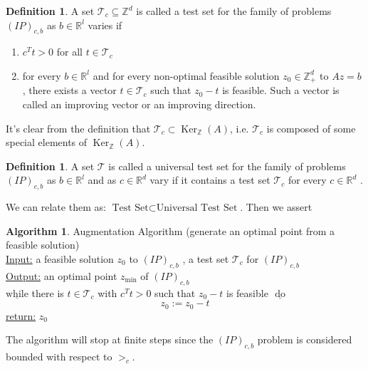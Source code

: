 \documentclass{article}
\theoremstyle{plain}
\theoremstyle{definition}
\newtheorem{definition}[theorem]{Definition}
\newtheorem{algorithm}[theorem]{Algorithm}
\begin{document}
\begin{definition}
A  set  $\mathcal{T}_{c} \subseteq \mathbb{Z}^{d}$  is called a test set for the family of problems  $(I P)_{c, b}$  as  $b \in \mathbb{R}^{l}$  varies if 
\begin{enumerate}
    \item $c^{T} t>0$  for all  $t \in \mathcal{T}_{c}$
    \item for every  $b \in \mathbb{R}^{l}$  and for every non-optimal feasible solution  $z_{0} \in \mathbb{Z}_{+}^{d}$  to  $A z=b$ , there exists a vector  $t \in \mathcal{T}_{c}$  such that  $z_{0}-t$  is feasible. Such a vector is called an improving vector or an improving direction.
\end{enumerate}
\end{definition}

It's clear from the definition that $\mathcal{T}_{c}\subset \operatorname{Ker}_{\mathbb{Z}}(A)$, i.e. $\mathcal{T}_{c} $ is composed of some special elements of $\operatorname{Ker}_{\mathbb{Z}}(A)$.

\begin{definition}A set  $\mathcal{T}$  is called a universal test set for the family of problems $ (I P)_{c, b}$  as $ b \in \mathbb{R}^{l}$  and as  $c \in \mathbb{R}^{d}$  vary if it contains a test set  $\mathcal{T}_{c}$  for every  $c \in \mathbb{R}^{d}$ .
\end{definition}

We can relate them as: $ \text{Test Set}\subset\text{Universal Test Set}$. Then we assert 

\begin{algorithm} Augmentation Algorithm (generate an optimal point from a feasible solution)\\
\underline{Input:} a feasible solution  $z_{0}$  to  $(I P)_{c, b}$ , a test set  $\mathcal{T}_{c}$  for  $(I P)_{c, b}$  \\
\underline{Output:} an optimal point  $z_{\min }$  of  $(I P)_{c, b}$ \\
$\underline{\text {while}} $ there is  $t \in \mathcal{T}_{c}$  with  $c^{T} t>0$  such that  $z_{0}-t$  is feasible  $\underline{\text { do }} $
$$z_{0}:=z_{0}-t$$
 \underline{return:} $z_{0}$
 \end{algorithm}
 
 The algorithm will stop at finite steps since the $(IP)_{c,b}$ problem is considered bounded with respect to $>_c$.
 
\end{document}
